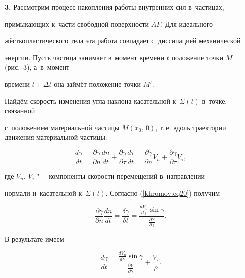 \textbf{3.} Рассмотрим процесс накопления работы внутренних сил в~частицах, 

примыкающих к~части свободной поверхности $AF$. Для идеального 

жёсткопластического тела эта работа совпадает с~диссипацией механической 

энергии. Пусть частица занимает в~момент времени $t$ положение точки $M$ (рис.~3), а~в~момент 

времени $t + \Delta t$ она займёт положение точки ${M}'$. 

Найдём скорость изменения угла наклона касательной к~$\Sigma \left( t \right)$ в~точке, связанной 

с~положением материальной частицы $M\left( {x_0 ,\,0} \right)$, т.\,е. вдоль траектории движения материальной частицы:

\begin{equation}

\label{khromov:eq23}

\frac{d\gamma }{dt} = \frac{\partial \gamma }{\partial n}\frac{dn}{dt} + 

\frac{\partial \gamma }{\partial \tau }\frac{d\tau }{dt} = \frac{\partial 

\gamma }{\partial n}V_n + \frac{\partial \gamma }{\partial \tau }V_\tau ,

\end{equation}

где $V_n$, $V_\tau $ "--- компоненты скорости перемещений в~направлении 

нормали и~касательной к~$\Sigma \left( t \right)$. Согласно (\ref{khromov:eq20}) получим

\begin{equation}

\label{khromov:eq24}

\frac{\partial \gamma }{\partial n}\frac{dn}{dt} = \frac{\delta \gamma 

}{\delta t} = \frac{\frac{dV_n }{d\gamma }\sin \gamma }{\frac{\partial 

Y}{\partial \gamma }}.

\end{equation}

В результате имеем 

\begin{equation}

\label{khromov:eq25}

\frac{d\gamma }{dt} = \frac{\frac{dV_n }{d\gamma }\sin \gamma 

}{\frac{\partial Y}{\partial \gamma }} + \frac{V_\tau }{\rho }.

\end{equation}







